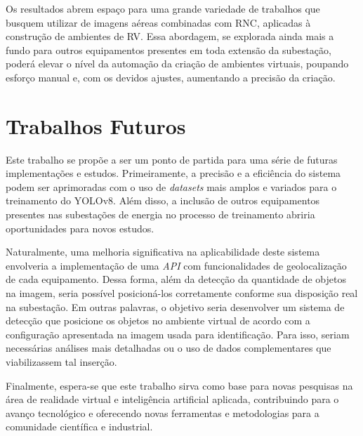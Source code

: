 Os resultados abrem espaço para uma grande variedade de trabalhos que busquem utilizar de imagens aéreas combinadas com RNC, aplicadas à construção de ambientes de RV. Essa abordagem, se explorada ainda mais a fundo para outros equipamentos presentes em toda extensão da subestação, poderá elevar o nível da automação da criação de ambientes virtuais, poupando esforço manual e, com os devidos ajustes, aumentando a precisão da criação.

\section{Trabalhos Futuros} 

Este trabalho se propõe a ser um ponto de partida para uma série de futuras implementações e estudos. Primeiramente, a precisão e a eficiência do sistema podem ser aprimoradas com o uso de \textit{datasets} mais amplos e variados para o treinamento do YOLOv8. Além disso, a inclusão de outros equipamentos presentes nas subestações de energia no processo de treinamento abriria oportunidades para novos estudos.

Naturalmente, uma melhoria significativa na aplicabilidade deste sistema envolveria a implementação de uma \textit{API} com funcionalidades de geolocalização de cada equipamento. Dessa forma, além da detecção da quantidade de objetos na imagem, seria possível posicioná-los corretamente conforme sua disposição real na subestação. Em outras palavras, o objetivo seria desenvolver um sistema de detecção que posicione os objetos no ambiente virtual de acordo com a configuração apresentada na imagem usada para identificação. Para isso, seriam necessárias análises mais detalhadas ou o uso de dados complementares que viabilizassem tal inserção.

Finalmente, espera-se que este trabalho sirva como base para novas pesquisas na área de realidade virtual e inteligência artificial aplicada, contribuindo para o avanço tecnológico e oferecendo novas ferramentas e metodologias para a comunidade científica e industrial.



